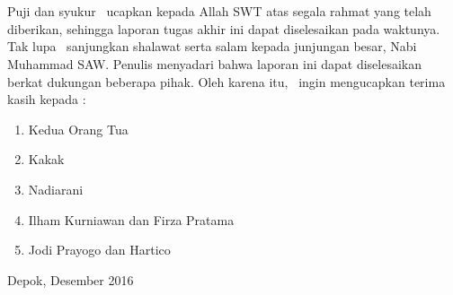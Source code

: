 \chapter*{\kataPengantar}

Puji dan syukur \saya~ucapkan kepada Allah SWT atas segala rahmat yang telah diberikan, sehingga laporan tugas akhir ini dapat diselesaikan pada waktunya. Tak lupa \saya~sanjungkan shalawat serta salam kepada junjungan besar, Nabi Muhammad SAW. Penulis menyadari bahwa laporan ini dapat diselesaikan berkat dukungan beberapa pihak. Oleh karena itu, \saya~ingin mengucapkan terima kasih kepada :

\begin{enumerate}
	\item Kedua Orang Tua \saya
	\item Kakak \saya
	\item Nadiarani
	\item Ilham Kurniawan dan Firza Pratama
	\item Jodi Prayogo dan Hartico
	
\end{enumerate}
\vspace*{0.1cm}
\begin{flushright}
	Depok, Desember 2016\\[0.1cm]
	\vspace*{1cm}
	\penulis
	
\end{flushright}